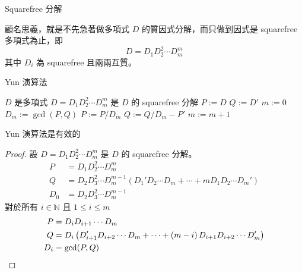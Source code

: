 \documentclass{beamer}
\newcommand{\N}{\mathbb N}
\theoremstyle{remark}
\begin{document}
\begin{CJK}{UTF8}{bsmi}
\begin{frame}{Squarefree 分解}
  \begin{definition}
    顧名思義，就是不先急著做多項式 $D$ 的質因式分解，而只做到因式是 squarefree 多項式為止，即
    \[D = D_1 D_2^2 \cdots D_m^m\]
    其中 $D_i$ 為 squarefree 且兩兩互質。
  \end{definition}
\end{frame}

\begin{frame}{Yun 演算法}
  \begin{algorithm}[H]
    \caption{求多項式 $D$ 的 squarefree 分解}
    \begin{algorithmic}[1]
      \REQUIRE $D$ 是多項式
      \ENSURE  $D = D_1 D_2^2 \cdots D_m^m$ 是 $D$ 的 squarefree 分解
      \STATE $P := D$
      \STATE $Q := D'$
      \STATE $m := 0$
	\STATE $D_m := \gcd(P,Q)$
	\STATE $P := P/D_m$
	\STATE $Q := Q/D_m - P'$
	\STATE $m := m + 1$
      \ENDWHILE
    \end{algorithmic}
  \end{algorithm}
\end{frame}

\begin{frame}{Yun 演算法是有效的}
  \begin{proof}
    設 $D = D_1 D_2^2 \cdots D_m^m$ 是 $D$ 的 squarefree 分解。
    \begin{align*}
      P   &= D_1 D_2^2 \cdots D_m^m\\
      Q   &= D_2 D_3^2 \cdots D_m^{m-1} \left( D_1' D_2 \cdots D_m + \cdots + m D_1 D_2 \cdots
	  D_m' \right)\\
      D_0 &= D_2 D_3^2 \cdots D_m^{m-1}
    \end{align*}
    對於所有 $i \in \N$ 且 $1 \le i \le m$
    \begin{align*}
      P   &= D_i D_{i+1} \cdots D_m\\
      Q   &= D_i \left( D_{i+1}' D_{i+2} \cdots D_m + \cdots + \left( m-i \right) D_{i+1} D_{i+2} \cdots D_m' \right)\\
      D_i &= \gcd(P,Q) \qedhere
    \end{align*}
  \end{proof}
\end{frame}


\end{CJK}
\end{document}
